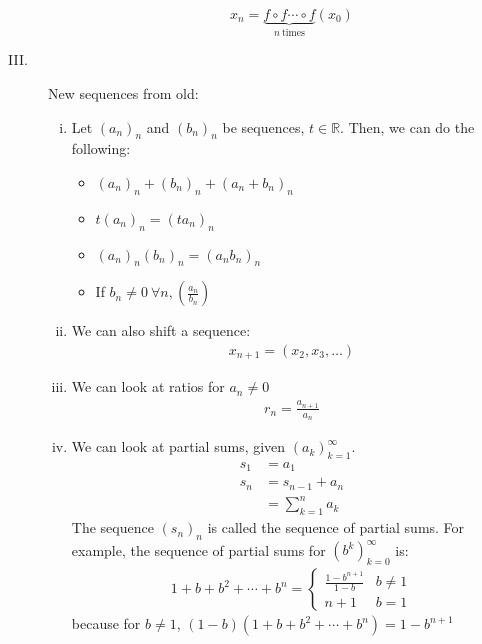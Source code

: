 \documentclass[10pt]{extarticle}
\newcommand{\R}{\mathbb{R}}
\begin{document}
\begin{description}
\begin{enumerate}[(i)]
            \[x_n = \underbrace{f\circ f\cdots \circ f}_{n~\text{times}}(x_0)\]
        \end{enumerate}
      \item[III.] New sequences from old: 
        \begin{enumerate}[(i)]
          \item Let $(a_n)_n$ and $(b_n)_n$ be sequences, $t\in\R$. Then, we can do the following:
            \begin{itemize}
              \item $(a_n)_n + (b_n)_n + (a_n + b_n)_n$
              \item $t(a_n)_n = (ta_n)_n$
              \item $(a_n)_n(b_n)_n = (a_nb_n)_n$
              \item If $b_n \neq 0~\forall n, \left(\frac{a_n}{b_n}\right)$
            \end{itemize}
          \item We can also shift a sequence:
            \begin{align*}
              x_{n+1} = (x_2,x_3,\dots)
            \end{align*}
          \item We can look at ratios for $a_n\neq 0$
            \begin{align*}
              r_n = \frac{a_{n+1}}{a_n}
            \end{align*}
          \item We can look at partial sums, given $(a_k)_{k=1}^{\infty}$.
            \begin{align*}
              s_1 &= a_1\\
              s_n &= s_{n-1} + a_n\\
                  &= \sum_{k=1}^{n}a_k
            \end{align*}
            The sequence $(s_n)_n$ is called the sequence of partial sums. For example, the sequence of partial sums for $(b^k)_{k=0}^{\infty}$ is:
            \begin{align*}
              1 + b + b^2 + \cdots + b^n = \begin{cases}
                \frac{1-b^{n+1}}{1-b}&b\neq 1\\
                n+1&b=1
              \end{cases}
            \end{align*}
            because for $b \neq 1$, $(1-b)(1+b+b^2+\cdots+b^n) = 1-b^{n+1}$
        \end{enumerate}
      \end{description}
\end{document}
